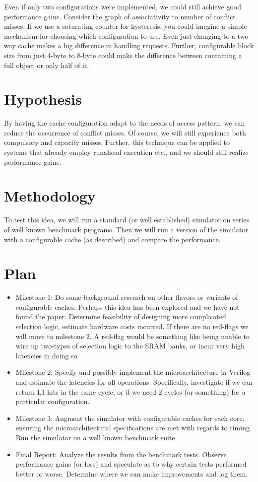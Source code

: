 \documentclass[pageno]{jpaper}
\begin{document}
Even if only two configurations were implemented, we could still achieve good performance gains.  Consider the graph of associativity to number of conflict misses. If we use a saturating counter for hysteresis, you could imagine a simple mechanism for choosing which configuration to use. Even just changing to a two-way cache makes a big difference in handling requests. Further, configurable block size from just 4-byte to 8-byte could make the difference between containing a full object or only half of it.


\section{Hypothesis}
By having the cache configuration adapt to the needs of access pattern, we can reduce the occurrence of conflict misses. Of course, we will still experience both compulsory and capacity misses. Further, this technique can be applied to systems that already employ runahead execution etc., and we should still realize performance gains.

\section{Methodology}
To test this idea, we will run a standard (or well established) simulator on series of well known benchmark programs. Then we will run a version of the simulator with a configurable cache (as described) and compare the performance.

\section{Plan}
\begin{itemize}
\item Milestone 1: Do some background research on other flavors or variants of configurable caches. Perhaps this idea has been explored and we have not found the paper. Determine feasibility of designing more complicated selection logic, estimate hardware costs incurred. If there are no red-flags we will move to milestone 2. A red-flag would be something like being unable to wire up two-types of selection logic to the SRAM banks, or incur very high latencies in doing so.

\item Milestone 2: Specify and possibly implement the microarchitecture in Verilog and estimate the latencies for all operations. Specifically, investigate if we can return L1 hits in the same cycle, or if we need 2 cycles (or something) for a particular configuration.

\item Milestone 3: Augment the simulator with configurable caches for each core, ensuring the microarchitectural specifications are met with regards to timing. Run the simulator on a well known benchmark suite.

\item Final Report: Analyze the results from the benchmark tests. Observe performance gains (or loss) and speculate as to why certain tests performed better or worse. Determine where we can make improvements and log them.

\end{itemize}
\end{document}
